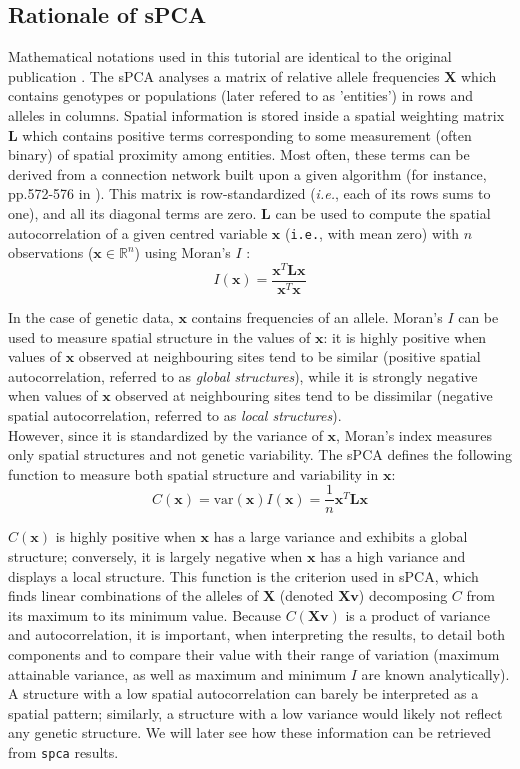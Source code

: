 \documentclass{article}
\newcommand{\R}{\mathbb{R}}
\newcommand{\beq}{\begin{equation}}
\newcommand{\eeq}{\end{equation}}
\newcommand{\m}[1]{\mathbf{#1}}
\begin{document}
\subsection{Rationale of sPCA}
Mathematical notations used in this tutorial are identical to the original publication \cite{tjart04}.
The sPCA analyses a matrix of relative allele frequencies $\m{X}$ which contains genotypes or
populations (later refered to as 'entities') in rows and alleles in columns.
Spatial information is stored inside a spatial weighting matrix
$\m{L}$ which contains positive terms corresponding to some measurement
(often binary) of spatial proximity among entities.
Most often, these terms can be derived from a connection network built
upon a given algorithm (for instance, pp.572-576 in \cite{tj88}).
This matrix is row-standardized (\textit{i.e.}, each of its rows sums
to one), and all its diagonal terms are zero.
$\m{L}$ can be used to compute the spatial autocorrelation of a
given centred variable $\m{x}$ (\texttt{i.e.}, with mean zero) with $n$ observations ($\m{x} \in
\R^n$) using Moran's $I$ \cite{tj223,tj222,tj436}:
\beq
I(\m{x}) = \frac{\m{x}^T\m{Lx}}{\m{x}^T\m{x}}
\label{eqn:I}
\eeq

In the case of genetic data, $\m{x}$ contains frequencies of an allele.
Moran's $I$ can be used to measure spatial structure in the values
of $\m{x}$: it is highly positive when values of $\m{x}$ observed at
neighbouring sites tend to be similar (positive spatial
autocorrelation, referred to as \emph{global structures}), while it is
strongly negative when values of $\m{x}$ observed at
neighbouring sites tend to be dissimilar (negative spatial
autocorrelation, referred to as \emph{local structures}).
\\


However, since it is standardized by the variance of
$\m{x}$, Moran's index measures only spatial structures and not genetic variability.
The sPCA defines the following function to measure both spatial
structure and variability in $\m{x}$:
\beq
C(\m{x}) = \mbox{var}(\m{x})I(\m{x}) = \frac{1}{n}\m{x}^T\m{Lx}
\label{eqn:C}
\eeq

$C(\m{x})$ is highly positive when $\m{x}$ has a large variance and
exhibits a global structure; conversely, it is largely negative
when $\m{x}$ has a high variance and displays a local structure.
This function is the criterion used in sPCA, which finds linear
combinations of the alleles of $\m{X}$ (denoted $\m{Xv}$) decomposing $C$ from its
maximum to its minimum value.
Because $C(\m{Xv})$ is a product of variance and autocorrelation,
it is important, when interpreting the results, to detail both
components and to compare their value with their range of variation
(maximum attainable variance, as well as maximum and minimum $I$ are
known analytically).
A structure with a low spatial autocorrelation can barely be
interpreted as a spatial pattern; similarly, a structure with a low
variance would likely not reflect any genetic structure.
We will later see how these information can be retrieved from \texttt{spca} results.
\end{document}
